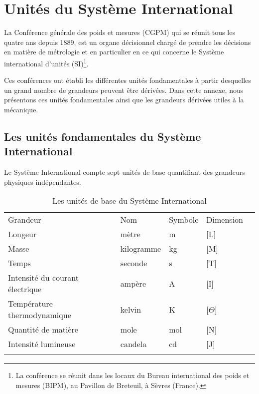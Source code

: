 \chapter{Unités du Système International\label{annexe-usi}}

La Conférence générale des poids et mesures (CGPM) 
qui se réunit tous les quatre ans depuis 1889, est un organe décisionnel chargé de prendre 
les décisions en matière de métrologie et en particulier en ce 
qui concerne le Système international d'unités (SI)\footnote{La conférence se réunit 
dans les locaux du Bureau international des poids et mesures (BIPM), au Pavillon de Breteuil, 
à Sèvres (France).}.

Ces conférences ont établi les différentes unités fondamentales 
à partir desquelles un grand nombre de grandeurs peuvent être dérivées. 
Dans cette annexe, nous présentons ces unités fondamentales ainsi que les grandeurs dérivées utiles à la mécanique.

\section*{Les unités fondamentales du Système International}
Le Système International compte sept unités de base quantifiant des grandeurs physiques indépendantes.

\begin{table}[!h]
    \centering
    \begin{tabular*}{15cm}{M{6cm}M{2.5cm}M{2.5cm}M{2.5cm}N}
        \hhline{====}
        Grandeur & Nom & Symbole & Dimension \\
        \hhline{----}
        Longeur & mètre & \si{\meter} & [L] \\
        Masse & kilogramme & \si{\kilogram} & [M] \\
        Temps & seconde & \si{\second} & [T] \\
        Intensité du courant électrique & ampère & \si{\ampere} & [I] \\
        Température thermodynamique & kelvin & \si{\kelvin} & [$\Theta$] \\
        Quantité de matière & mole & \si{\mole} & [N] \\
        Intensité lumineuse & candela & \si{\candela} & [J] \\
        \hhline{====}
    \end{tabular*}
    \caption{Les unités de base du Système International}
\end{table}

